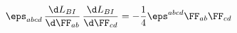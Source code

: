 \begin{equation}
\eps_{abcd}\,\frac{\d L_{BI}}{\d\FF_{ab}}\,\frac{\d L_{BI}}{\d\FF_{cd}} =
-\frac{1}{4}\eps^{abcd}\FF_{ab}\FF_{cd}
\end{equation}

